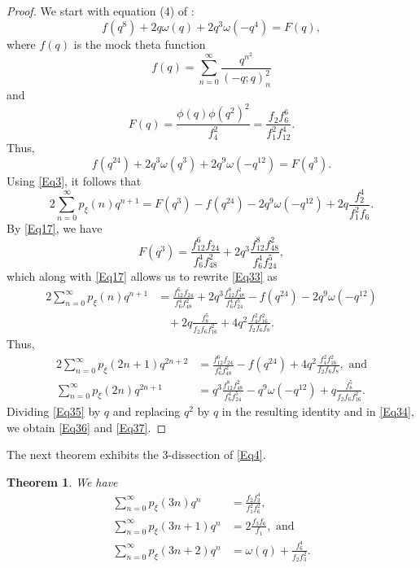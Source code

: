 \documentclass[12pt]{article}
\newtheorem{theorem}{Theorem}[section]
\begin{document}
\begin{proof}
We start with equation (4) of \cite{APSY}:
\begin{equation*}
f(q^8) +2q\omega(q) + 2q^3\omega(-q^4) = F(q),
\end{equation*}
where $f(q)$ is the mock theta function 
$$f(q) = \sum_{n=0}^{\infty} \frac{q^{n^2}}{(-q;q)_{n}^{2}}$$
and 
\begin{equation*}
F(q) = \frac{\phi(q)\phi(q^2)^2}{f_4^2} = \frac{f_2f_{6}^6}{f_1^2f_{12}^4}.
\end{equation*}
Thus,
\begin{equation*}
f(q^{24}) +2q^3\omega(q^3) + 2q^9\omega(-q^{12}) = F(q^3).
\end{equation*}
Using \eqref{Eq3}, it follows that
\begin{equation}
2\sum_{n=0}^{\infty} p_{\xi}(n)q^{n+1} = F(q^3) - f(q^{24}) - 2q^9\omega(-q^{12}) + 2q\frac{f_2^4}{f_1^2f_6}.
\label{Eq33}
\end{equation}
By \eqref{Eq17}, we have
\begin{equation*}
F(q^3) = \frac{f_{12}^6f_{24}}{f_6^4f_{48}^2} + 2q^3\frac{f_{12}^8f_{48}^2}{f_6^4f_{24}^5},
\end{equation*}
which along with \eqref{Eq17} allows us to rewrite \eqref{Eq33} as
\begin{align*}
2\sum_{n=0}^{\infty} p_{\xi}(n)q^{n+1} & = \frac{f_{12}^6f_{24}}{f_6^4f_{48}^2} + 2q^3\frac{f_{12}^8f_{48}^2}{f_6^4f_{24}^5} - f(q^{24}) - 2q^9\omega(-q^{12}) \\ 
& \ \ \ \ + 2q\frac{f_8^5}{f_2f_6f_{16}^2} +4q^2\frac{f_4^2f_{16}^2}{f_2f_6f_8}.
\end{align*}
Thus,
\begin{align}
2\sum_{n=0}^{\infty} p_{\xi}(2n+1)q^{2n+2} & = \frac{f_{12}^6f_{24}}{f_6^4f_{48}^2} - f(q^{24})  +4q^2\frac{f_4^2f_{16}^2}{f_2f_6f_8}, \textrm{\ \ and} \label{Eq34} \\
\sum_{n=0}^{\infty} p_{\xi}(2n)q^{2n+1} & = q^3\frac{f_{12}^8f_{48}^2}{f_6^4f_{24}^5} - q^9\omega(-q^{12}) + q\frac{f_8^5}{f_2f_6f_{16}^2}. \label{Eq35}
\end{align}
Dividing \eqref{Eq35} by $q$ and replacing $q^2$ by $q$ in the resulting identity and in \eqref{Eq34}, we obtain \eqref{Eq36} and \eqref{Eq37}.
\end{proof}

The next theorem exhibits the 3-dissection of \eqref{Eq4}. 

\begin{theorem} We have
\begin{align}
\sum_{n=0}^{\infty} p_{\xi}(3n)q^n & = \frac{f_{2}f_{3}^4}{f_{1}^2f_{6}^2}, \label{xi_3n} \\
\sum_{n=0}^{\infty} p_{\xi}(3n+1)q^n & = 2\frac{f_{3}f_{6}}{f_{1}}, \textrm{\ \ and} \label{xi_3n+1} \\
\sum_{n=0}^{\infty} p_{\xi}(3n+2)q^n & =  \omega(q) + \frac{f_{6}^4}{f_2f_{3}^2}. \label{xi_3n+2}
\end{align}
\label{T0}
\end{theorem}
\end{document}

